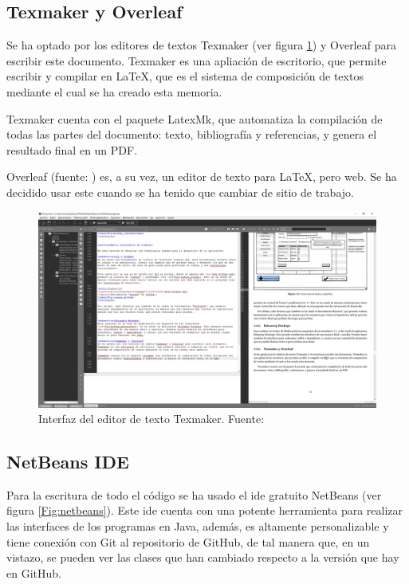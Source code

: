 \subsection{Texmaker y Overleaf}
Se ha optado por los editores de textos Texmaker (ver figura \ref{Fig:texmaker}) y Overleaf para escribir este documento. Texmaker es una apliación de escritorio, que permite escribir y compilar en \LaTeX{}, que es el sistema de composición de textos mediante el cual se ha creado esta memoria.

Texmaker cuenta con el paquete LatexMk, que automatiza la compilación de todas las partes del documento: texto, bibliografía y referencias, y genera el resultado final en un PDF.

Overleaf (fuente: \cite{overleaf}) es, a su vez, un editor de texto para \LaTeX{}, pero web. Se ha decidido usar este cuando se ha tenido que cambiar de sitio de trabajo.

\begin{figure}[h]
\centering\includegraphics[width=1\linewidth]{figs/Texmaker.png}
\caption{Interfaz del editor de texto Texmaker. Fuente: \cite{texmaker}}
\label{Fig:texmaker}
\end{figure}


\subsection{NetBeans IDE}
Para la escritura de todo el código se ha usado el \gls{ide} gratuito NetBeans (ver figura \ref{Fig:netbeans}).
Este \gls{ide} cuenta con una potente herramienta para realizar las interfaces de los programas en Java, además, es altamente personalizable y tiene conexión con Git al repositorio de GitHub, de tal manera que, en un vistazo, se pueden ver las clases que han cambiado respecto a la versión que hay en GitHub.

